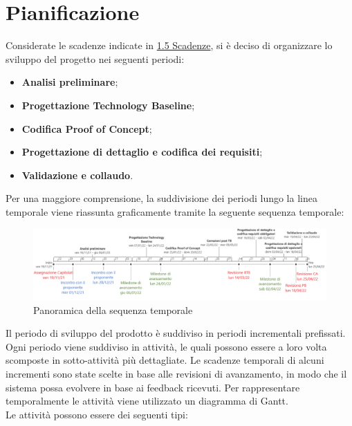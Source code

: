 \section{Pianificazione} \label{section:pianificazione}

Considerate le scadenze indicate in \hyperref[subsection:intro_scadenze]{1.5 Scadenze}, si è deciso di organizzare lo sviluppo del progetto nei seguenti periodi:
\begin{itemize}
  \item \textbf{Analisi preliminare};
  \item \textbf{Progettazione Technology Baseline};
  \item \textbf{Codifica Proof of Concept\glo{}};
  \item \textbf{Progettazione di dettaglio e codifica dei requisiti};
  \item \textbf{Validazione e collaudo}.
\end{itemize}
Per una maggiore comprensione, la suddivisione dei periodi lungo la linea temporale viene riassunta graficamente tramite la seguente sequenza temporale:
\begin{figure}[H]
  \centering
  \includegraphics[scale=0.6]{immagini/sequenza_temporale.png}
  \caption{Panoramica della sequenza temporale}
\end{figure}
Il periodo di sviluppo del prodotto è suddiviso in periodi incrementali prefissati. Ogni periodo viene suddiviso in attività, le quali possono essere a loro volta scomposte in sotto-attività più dettagliate.
Le scadenze temporali di alcuni incrementi sono state scelte in base alle revisioni di avanzamento, in modo che il sistema possa evolvere in base ai feedback ricevuti.
Per rappresentare temporalmente le attività viene utilizzato un diagramma di Gantt\glo{}.
\\Le attività possono essere dei seguenti tipi:
